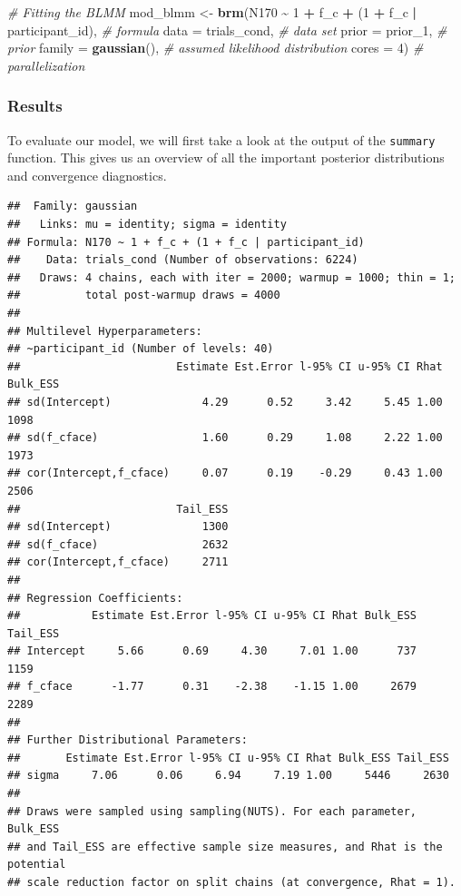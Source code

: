 \documentclass[
  doc,12pt,floatsintext]{apa7}
\newenvironment{Shaded}{\begin{snugshade}}{\end{snugshade}}
\newcommand{\AttributeTok}[1]{\textcolor[rgb]{0.13,0.29,0.53}{#1}}
\newcommand{\CommentTok}[1]{\textcolor[rgb]{0.56,0.35,0.01}{\textit{#1}}}
\newcommand{\DecValTok}[1]{\textcolor[rgb]{0.00,0.00,0.81}{#1}}
\newcommand{\FunctionTok}[1]{\textcolor[rgb]{0.13,0.29,0.53}{\textbf{#1}}}
\newcommand{\NormalTok}[1]{#1}
\newcommand{\OtherTok}[1]{\textcolor[rgb]{0.56,0.35,0.01}{#1}}
\newcommand{\SpecialCharTok}[1]{\textcolor[rgb]{0.81,0.36,0.00}{\textbf{#1}}}
\begin{document}
\begin{Shaded}
\begin{Highlighting}[]
\CommentTok{\# Fitting the BLMM}
\NormalTok{mod\_blmm }\OtherTok{\textless{}{-}} \FunctionTok{brm}\NormalTok{(N170 }\SpecialCharTok{\textasciitilde{}} \DecValTok{1} \SpecialCharTok{+}\NormalTok{ f\_c }\SpecialCharTok{+}\NormalTok{ (}\DecValTok{1} \SpecialCharTok{+}\NormalTok{ f\_c }\SpecialCharTok{|}\NormalTok{ participant\_id), }\CommentTok{\# formula}
                \AttributeTok{data =}\NormalTok{ trials\_cond, }\CommentTok{\# data set}
                \AttributeTok{prior =}\NormalTok{ prior\_1, }\CommentTok{\# prior}
                \AttributeTok{family =} \FunctionTok{gaussian}\NormalTok{(), }\CommentTok{\# assumed likelihood distribution}
                \AttributeTok{cores =} \DecValTok{4}\NormalTok{) }\CommentTok{\# parallelization}
\end{Highlighting}
\end{Shaded}

\subsubsection{Results}\label{results-1}

To evaluate our model, we will first take a look at the output of the \texttt{summary} function. This gives us an overview of all the important posterior distributions and convergence diagnostics.

\footnotesize

\begin{verbatim}
##  Family: gaussian 
##   Links: mu = identity; sigma = identity 
## Formula: N170 ~ 1 + f_c + (1 + f_c | participant_id) 
##    Data: trials_cond (Number of observations: 6224) 
##   Draws: 4 chains, each with iter = 2000; warmup = 1000; thin = 1;
##          total post-warmup draws = 4000
## 
## Multilevel Hyperparameters:
## ~participant_id (Number of levels: 40) 
##                        Estimate Est.Error l-95% CI u-95% CI Rhat Bulk_ESS
## sd(Intercept)              4.29      0.52     3.42     5.45 1.00     1098
## sd(f_cface)                1.60      0.29     1.08     2.22 1.00     1973
## cor(Intercept,f_cface)     0.07      0.19    -0.29     0.43 1.00     2506
##                        Tail_ESS
## sd(Intercept)              1300
## sd(f_cface)                2632
## cor(Intercept,f_cface)     2711
## 
## Regression Coefficients:
##           Estimate Est.Error l-95% CI u-95% CI Rhat Bulk_ESS Tail_ESS
## Intercept     5.66      0.69     4.30     7.01 1.00      737     1159
## f_cface      -1.77      0.31    -2.38    -1.15 1.00     2679     2289
## 
## Further Distributional Parameters:
##       Estimate Est.Error l-95% CI u-95% CI Rhat Bulk_ESS Tail_ESS
## sigma     7.06      0.06     6.94     7.19 1.00     5446     2630
## 
## Draws were sampled using sampling(NUTS). For each parameter, Bulk_ESS
## and Tail_ESS are effective sample size measures, and Rhat is the potential
## scale reduction factor on split chains (at convergence, Rhat = 1).
\end{verbatim}
\end{document}
